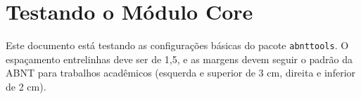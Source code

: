 \documentclass[12pt, a4paper]{scrbook}
\title{\@abntTitulo}
\author{\@abntAutor}
\begin{document}
\maketitle %

\chapter{Testando o Módulo Core}

Este documento está testando as configurações básicas do pacote \texttt{abnttools}.
O espaçamento entrelinhas deve ser de 1,5, e as margens devem seguir o padrão
da ABNT para trabalhos acadêmicos (esquerda e superior de 3 cm, direita e inferior
de 2 cm).

\lipsum[1-5] %
\end{document}
